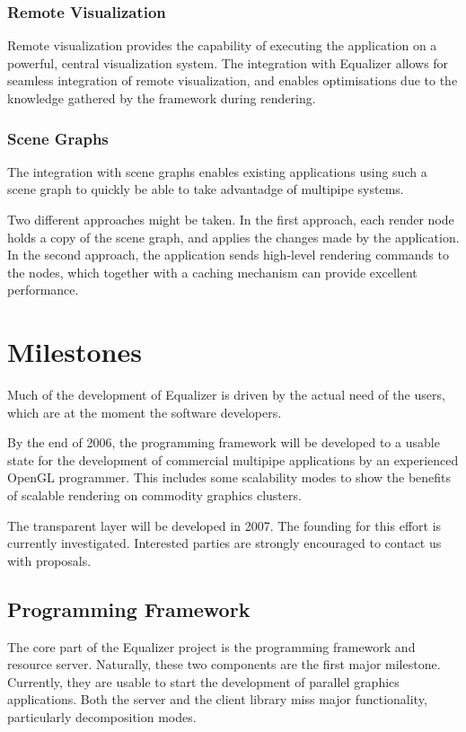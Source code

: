\documentclass[10pt,a4paper]{scrartcl}
\begin{document}
\subsubsection{Remote Visualization}
Remote visualization provides the capability of executing the
application on a powerful, central visualization system. The integration
with Equalizer allows for seamless integration of remote visualization,
and enables optimisations due to the knowledge gathered by the
framework during rendering.

\subsubsection{Scene Graphs}
The integration with scene graphs enables existing applications
using such a scene graph to quickly be able to take advantadge of
multipipe systems.

Two different approaches might be taken. In the first approach, each render node
holds a copy of the scene graph, and applies the changes made by the
application. In the second approach, the application sends high-level
rendering commands to the nodes, which together with a caching mechanism
can provide excellent performance.

\section{Milestones}

Much of the development of Equalizer is driven by the actual need of the
users, which are at the moment the software developers. 

By the end of 2006, the programming framework will be developed to a
usable state for the development of commercial multipipe applications by
an experienced OpenGL programmer. This includes some scalability modes
to show the benefits of scalable rendering on commodity graphics clusters.

The transparent layer will be developed in 2007. The founding for this
effort is currently investigated. Interested parties are strongly
encouraged to contact us with proposals.

\subsection{Programming Framework}
The core part of the Equalizer project is the programming framework and
resource server. Naturally, these two components are the first major
milestone. Currently, they are usable to start the development of
parallel graphics applications. Both the server and the client library
miss major functionality, particularly decomposition modes. 
\end{document}
